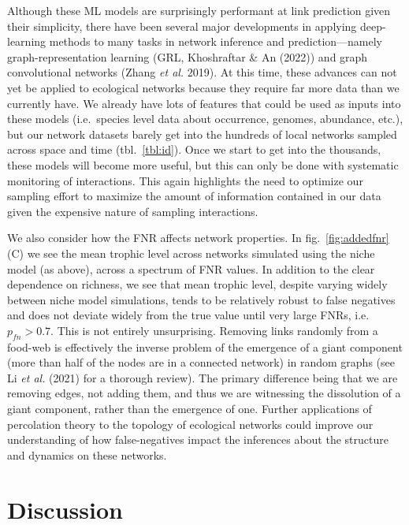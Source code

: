 \documentclass[10pt,oneside]{article}
\begin{document}
Although these ML models are surprisingly performant at link prediction
given their simplicity, there have been several major developments in
applying deep-learning methods to many tasks in network inference and
prediction---namely graph-representation learning (GRL, Khoshraftar \&
An (2022)) and graph convolutional networks (Zhang \emph{et al.} 2019).
At this time, these advances can not yet be applied to ecological
networks because they require far more data than we currently have. We
already have lots of features that could be used as inputs into these
models (i.e.~species level data about occurrence, genomes, abundance,
etc.), but our network datasets barely get into the hundreds of local
networks sampled across space and time (tbl.~\ref{tbl:id}). Once we
start to get into the thousands, these models will become more useful,
but this can only be done with systematic monitoring of interactions.
This again highlights the need to optimize our sampling effort to
maximize the amount of information contained in our data given the
expensive nature of sampling interactions.

We also consider how the FNR affects network properties. In
fig.~\ref{fig:addedfnr}(C) we see the mean trophic level across networks
simulated using the niche model (as above), across a spectrum of FNR
values. In addition to the clear dependence on richness, we see that
mean trophic level, despite varying widely between niche model
simulations, tends to be relatively robust to false negatives and does
not deviate widely from the true value until very large FNRs,
i.e.~\(p_{fn} > 0.7\). This is not entirely unsurprising. Removing links
randomly from a food-web is effectively the inverse problem of the
emergence of a giant component (more than half of the nodes are in a
connected network) in random graphs (see Li \emph{et al.} (2021) for a
thorough review). The primary difference being that we are removing
edges, not adding them, and thus we are witnessing the dissolution of a
giant component, rather than the emergence of one. Further applications
of percolation theory to the topology of ecological networks could
improve our understanding of how false-negatives impact the inferences
about the structure and dynamics on these networks.

\hypertarget{discussion}{%
\section{Discussion}\label{discussion}}
\end{document}
